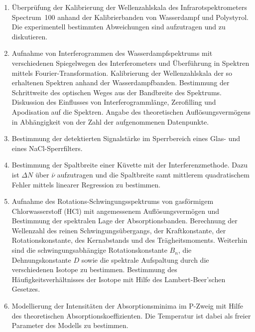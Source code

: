 \documentclass[11pt,a4paper]{article}
\newcommand{\wz}{\ensuremath{\bar{\nu}}}          %
\begin{document}
\begin{enumerate}
  \item[1.1] Überprüfung der Kalibrierung der Wellenzahlskala des
        Infrarotspektrometers Spectrum~100 anhand der Kalibrierbanden von
        Wasserdampf und Polystyrol. Die experimentell bestimmten Abweichungen
        sind aufzutragen und zu diskutieren.

  \item[1.2] Aufnahme von Interferogrammen des Wasserdampfspektrums mit
        verschiedenen Spiegelwegen des Interferometers und Überführung in
        Spektren mittels Fourier-Transformation. Kalibrierung der Wellenzahlskala
        der so erhaltenen Spektren anhand der Wasserdampfbanden. Bestimmung der
        Schrittweite des optischen Weges aus der Bandbreite des Spektrums.
        Diskussion des Einflusses von Interferogrammlänge, Zerofilling und
        Apodisation auf die Spektren. Angabe des theoretischen
        Auflösungsvermögens in Abhängigkeit von der Zahl der aufgenommenen
        Datenpunkte.

  \item[1.3] Bestimmung der detektierten Signalstärke im Sperrbereich eines
        Glas- und eines NaCl-Sperrfilters.

  \item[1.4] Bestimmung der Spaltbreite einer Küvette mit der Interferenzmethode.
        Dazu ist $\Delta N$ über \wz{} aufzutragen und die Spaltbreite samt
        mittlerem quadratischem Fehler mittels linearer Regression zu bestimmen.

  \item[1.5] Aufnahme des Rotations-Schwingungsspektrums von gasförmigem
        Chlorwasserstoff (HCl) mit angemessenem Auflösungsvermögen und Bestimmung
        der spektralen Lage der Absorptionsbanden. Berechnung der Wellenzahl des
        reinen Schwingungsübergangs, der Kraftkonstante, der Rotationskonstante,
        des Kernabstands und des Trägheitsmoments. Weiterhin sind die
        schwingungsabhängige Rotationskonstante $B_n$, die Dehnungskonstante $D$
        sowie die spektrale Aufspaltung durch die verschiedenen Isotope zu
        bestimmen. Bestimmung des Häufigkeitsverhältnisses der Isotope mit Hilfe
        des Lambert-Beer'schen Gesetzes.

  \item[1.6] Modellierung der Intensitäten der Absorptionsminima im P-Zweig mit
        Hilfe des theoretischen Absorptionskoeffizienten. Die Temperatur ist
        dabei als freier Parameter des Modells zu bestimmen.
\end{enumerate}
\end{document}
